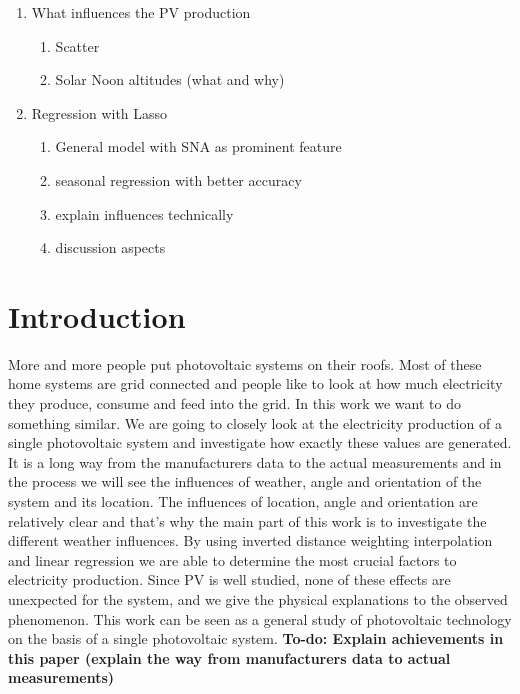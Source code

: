 \documentclass{article}
\begin{document}
\begin{enumerate}
	\item What influences the PV production\begin{enumerate}
		\item Scatter
		\item Solar Noon altitudes (what and why)
	\end{enumerate}
	\item Regression with Lasso\begin{enumerate}
		\item General model with SNA as prominent feature
		\item seasonal regression with better accuracy
		\item explain influences technically
		\item discussion aspects
	\end{enumerate}
\end{enumerate}

\section{Introduction}\label{sec:intro}
More and more people put photovoltaic systems on their roofs. 
Most of these home systems are grid connected and people like to look at how much electricity they produce, consume and feed into the grid.
In this work we want to do something similar. We are going to closely look at the electricity production of a single photovoltaic system and investigate how exactly these values are generated.
It is a long way from the manufacturers data to the actual measurements and in the process we will see the influences of weather, angle and orientation of the system and its location.
The influences of location, angle and orientation are relatively clear and that's why the main part of this work is to investigate the different weather influences.
By using inverted distance weighting interpolation and linear regression we are able to determine the most crucial factors to electricity production.
Since PV is well studied, none of these effects are unexpected for the system, and we give the physical explanations to the observed phenomenon.
This work can be seen as a general study of photovoltaic technology on the basis of a single photovoltaic system. 
\textbf{To-do: Explain achievements in this paper (explain the way from manufacturers data to actual measurements)}
\end{document}
